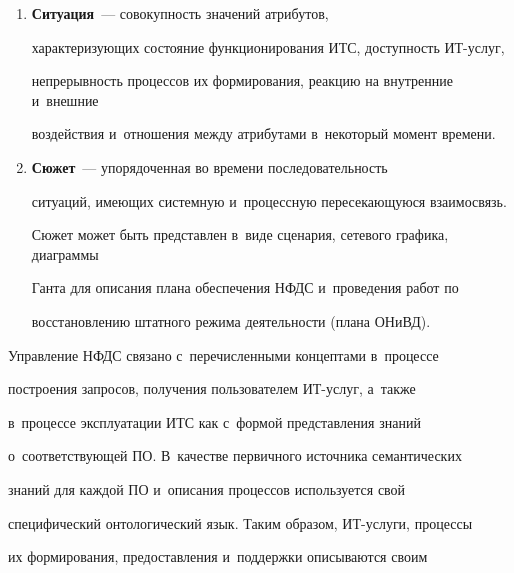 \begin{enumerate}[1.]
  ре\-сурс\-но-сер\-вис\-ных возможностей ИТС в ИТ-услуги. С~точки зрения


управления НФДС в~категорию <<процессы>> попадают понятия, атрибуты


которых описывают требования бенефицианта\!/\!реципиента ИТ-услуги,


состояние негативных факторов, сценарий их воздействия на компоненты ИТС,


каналы воздействия, результаты нарушения функциональности и~доступности


сервисов и~услуг, риски и~т.\,д.


  \item \textbf{Ситуация}~--- совокупность значений атрибутов,


характеризующих состояние функционирования ИТС, доступность ИТ-услуг,


непрерывность процессов их формирования, реакцию на внутренние и~внешние


воздействия и~отношения между атрибутами в~некоторый момент времени.


  \item \textbf{Сюжет}~--- упорядоченная во времени последовательность


ситуаций, име\-ющих системную и~процессную пересекающуюся взаимосвязь.


Сюжет может быть представлен в~виде сценария, сетевого графика, диаграммы


Ганта для описания плана обеспечения НФДС и~проведения работ по


восстановлению штатного режима деятельности (плана ОНиВД).


  \end{enumerate}





  Управление НФДС связано с~перечисленными концептами в~процессе


построения запросов, получения пользователем ИТ-услуг, а~так\-же


в~процессе эксплуатации ИТС как с~формой представления знаний


о~соответствующей ПО. В~качестве первичного источника семантических


знаний для каждой ПО и~описания процессов используется свой


специфический онтологический язык. Таким образом, ИТ-услу\-ги, процессы


их формирования, предоставления и~поддержки описываются своим


